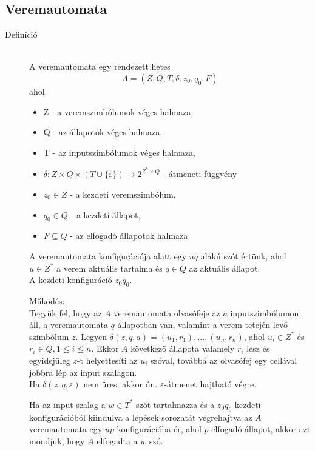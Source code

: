 \documentclass[margin=0px]{article}
\begin{document}
		\subsection{Veremautomata}
			\begin{description}
				\item[Definíció] \hfill \\
					A veremautomata egy rendezett hetes
					\[A = (Z,Q, T, \delta, z_0, q_0, F)\]
					ahol
					\begin{itemize}
						\item Z - a veremszimbólumok véges halmaza,
						\item Q - az állapotok véges halmaza,
						\item T - az inputszimbólumok véges halmaza,
						\item $\delta : Z \times Q \times (T \cup \{\varepsilon\}) \rightarrow 2^{Z^* \times Q}$ - átmeneti függvény
						\item $z_0 \in Z $ - a kezdeti veremszimbólum,
						\item $q_0 \in Q $ - a kezdeti állapot,
						\item $F \subseteq Q$ - az elfogadó állapotok halmaza
					\end{itemize}
					
					A veremautomata konfigurációja alatt egy $uq$ alakú szót értünk, ahol $u \in Z^*$ a verem aktuális tartalma és $q \in Q$ az aktuális állapot. \\
					A kezdeti konfiguráció $z_0q_0$.
					
					Működés: \\
					Tegyük fel, hogy az $A$ veremautomata olvasófeje az $a$ inputszimbólumon áll, a veremautomata $q$ állapotban van, valamint a verem tetején levő szimbólum $z$. Legyen $ \delta(z, q, a) = {(u_1, r_1), . . . , (u_n, r_n)}$, ahol $u_i \in Z^*$ és $r_i \in Q, 1 \leq i \leq n$. Ekkor $A$ következő állapota valamely $r_i$ lesz és egyidejűleg $z$-t helyettesíti az $u_i$ szóval, továbbá az olvasófej egy cellával jobbra lép az input szalagon.\\
					Ha $\delta(z, q, \varepsilon)$ nem üres, akkor ún. $\varepsilon$-átmenet hajtható végre.
					
					Ha az input szalag a $w \in T^*$ szót tartalmazza és a $z_0q_0$ kezdeti konfigurációból kiindulva a lépések sorozatát végrehajtva az $A$ veremautomata egy $up$ konfigurációba ér, ahol $p$ elfogadó állapot, akkor azt mondjuk, hogy $A$ elfogadta a $w$ szó.
					

\end{description}
\end{document}
